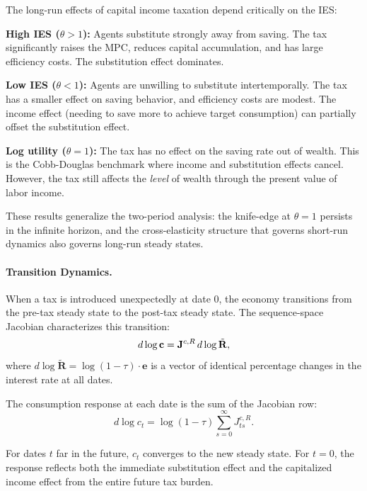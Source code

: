 \begin{calloutimportant}
The long-run effects of capital income taxation depend critically on the IES:

\medskip
\textbf{High IES ($\theta > 1$):} Agents substitute strongly away from saving. The tax significantly raises the MPC, reduces capital accumulation, and has large efficiency costs. The substitution effect dominates.

\medskip
\textbf{Low IES ($\theta < 1$):} Agents are unwilling to substitute intertemporally. The tax has a smaller effect on saving behavior, and efficiency costs are modest. The income effect (needing to save more to achieve target consumption) can partially offset the substitution effect.

\medskip
\textbf{Log utility ($\theta = 1$):} The tax has no effect on the saving rate out of wealth. This is the Cobb-Douglas benchmark where income and substitution effects cancel. However, the tax still affects the \emph{level} of wealth through the present value of labor income.

\medskip
These results generalize the two-period analysis: the knife-edge at $\theta = 1$ persists in the infinite horizon, and the cross-elasticity structure that governs short-run dynamics also governs long-run steady states.
\end{calloutimportant}

\paragraph{Transition Dynamics.}
When a tax is introduced unexpectedly at date 0, the economy transitions from the pre-tax steady state to the post-tax steady state. The sequence-space Jacobian characterizes this transition:
\begin{equation}
d \log \mathbf{c} = \mathbf{J}^{c,R} \, d \log \tilde{\mathbf{R}},
\label{eq:transition-tax}
\end{equation}
where $d \log \tilde{\mathbf{R}} = \log(1-\tau) \cdot \mathbf{e}$ is a vector of identical percentage changes in the interest rate at all dates.

The consumption response at each date is the sum of the Jacobian row:
\begin{equation}
d \log c_t = \log(1-\tau) \sum_{s=0}^{\infty} J^{c,R}_{ts}.
\label{eq:consumption-transition}
\end{equation}

For dates $t$ far in the future, $c_t$ converges to the new steady state. For $t = 0$, the response reflects both the immediate substitution effect and the capitalized income effect from the entire future tax burden.

